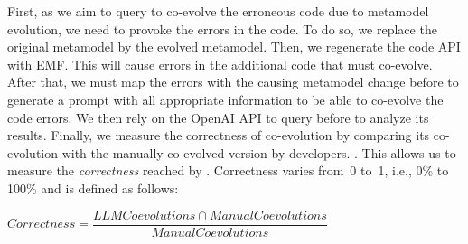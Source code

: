 First, as we aim to query \LLM to co-evolve the erroneous code due to metamodel evolution, we need to provoke the errors in the code. To do so, we replace the original metamodel by the evolved metamodel. Then, we regenerate the code API with EMF. This will cause errors in the additional code that must co-evolve. 
%
After that, we must map the errors with the causing metamodel change before to generate a prompt with all appropriate information to be able to co-evolve the code errors. We then rely on the OpenAI API to query \LLM before to analyze its results. 
%
%
Finally, we measure the correctness of \LLM co-evolution by comparing its co-evolution with the manually co-evolved version by developers. . This allows us to measure the \emph{correctness} reached by \LLM. %
Correctness varies from~0 to~1, i.e., 0\% to 100\% and is defined as follows:
\vspace{0.5em}

\noindent $ Correctness = \dfrac{LLM Coevolutions \cap Manual Coevolutions}{Manual Coevolutions} $

\vspace{0.5em}

